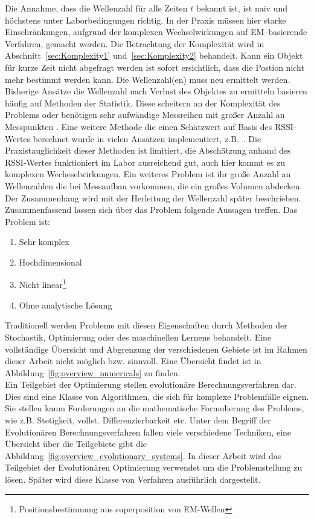 Die Annahme, dass die Wellenzahl für alle Zeiten $t$ bekannt ist, ist naiv und höchstens unter Laborbedingungen richtig. In der Praxis müssen hier starke Einschränkungen, aufgrund der komplexen Wechselwirkungen auf EM--basierende Verfahren, gemacht werden. Die Betrachtung der Komplexität wird in Abschnitt~\ref{sec:Komplexity1} und~\ref{sec:Komplexity2} behandelt. Kann ein Objekt für kurze Zeit nicht abgefragt werden ist sofort ersichtlich, dass die Postion nicht mehr bestimmt werden kann. Die Wellenzahl(en) muss neu ermittelt werden.\\ 
%

Bisherige Ansätze die Wellenzahl nach Verlust des Objektes zu ermitteln basieren häufig auf Methoden der Statistik. Diese scheitern an der Komplexität des Problems oder benötigen sehr aufwändige Messreihen mit großer Anzahl an Messpunkten \cite{amedo1}. Eine weitere Methode die einen Schätzwert auf Basis des RSSI-Wertes berechnet wurde in vielen Ansätzen implementiert, z.B.~\cite{KALMANandSMOOTHING}. Die Praxistauglichkeit dieser Methoden ist limitiert, die Abschätzung anhand des RSSI-Wertes funktioniert im Labor ausreichend gut, auch hier kommt es zu komplexen Wecheselwirkungen. Ein weiteres Problem ist ihr große Anzahl an Wellenzahlen die bei Messaufbau vorkommen, die ein großes Volumen abdecken. Der Zusammenhang wird mit der Herleitung der Wellenzahl später beschrieben.\\
%

Zusammenfassend lassen sich über das Problem folgende Aussagen treffen. Das Problem ist: 
%
\begin{enumerate}[itemsep=0mm]
	\item Sehr komplex
	\item Hochdimensional
	\item Nicht linear\footnote{Positionsbestimmung aus superposition von EM-Wellen}
	\item Ohne analytische Lösung
\end{enumerate}
%

Traditionell werden Probleme mit diesen Eigenschaften durch Methoden der Stochastik, Optimierung oder des maschinellen Lernens behandelt. Eine vollständige Übersicht und Abgrenzung der verschiedenen Gebiete ist im Rahmen dieser Arbeit nicht möglich bzw. sinnvoll. Eine Übersicht findet ist in Abbildung~\ref{fig:overview_numericals} zu finden.\\
%

Ein Teilgebiet der Optimierung stellen evolutionäre Berechnungsverfahren dar. Dies sind eine Klasse von Algorithmen, die sich für komplexe Problemfälle eignen. Sie stellen kaum Forderungen an die mathematische Formulierung des Problems, wie z.B. Stetigkeit, vollst. Differenzierbarkeit etc. Unter dem Begriff der Evolutionären Berechnungsverfahren fallen viele verschiedene Techniken, eine Übersicht über die Teilgebiete gibt die Abbildung~\ref{fig:overview_evolutionary_systems}. In dieser Arbeit wird das Teilgebiet der Evolutionären Optimierung verwendet um die Problemstellung zu lösen. Später wird diese Klasse von Verfahren ausführlich dargestellt.
%

